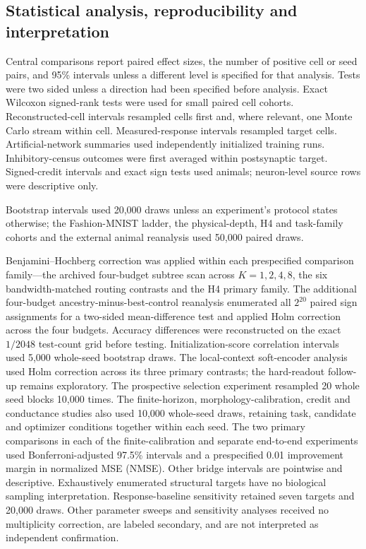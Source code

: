 \subsection{Statistical analysis, reproducibility and interpretation}
\label{note:statistics}

Central comparisons report paired effect sizes, the number of positive cell
or seed pairs, and 95\% intervals unless a different level is specified for
that analysis. Tests were two sided unless a direction had been specified
before analysis. Exact Wilcoxon signed-rank tests were used for
small paired cell cohorts. Reconstructed-cell intervals resampled cells first
and, where relevant, one Monte Carlo stream within cell. Measured-response
intervals resampled target cells. Artificial-network summaries used
independently initialized training runs. Inhibitory-census outcomes were first
averaged within postsynaptic target. Signed-credit intervals and exact sign
tests used animals; neuron-level source rows were descriptive only.

Bootstrap intervals used 20,000 draws unless an experiment's protocol states
otherwise; the Fashion-MNIST ladder, the physical-depth, H4 and task-family
cohorts and the external animal reanalysis used 50,000 paired draws.

Benjamini--Hochberg correction was applied within each prespecified comparison
family---the archived four-budget subtree scan across $K=1,2,4,8$, the six
bandwidth-matched routing contrasts and the H4 primary family. The additional four-budget ancestry-minus-best-control reanalysis enumerated
all $2^{20}$ paired sign assignments for a two-sided mean-difference test
and applied Holm correction across the four budgets. Accuracy differences
were reconstructed on the exact $1/2048$ test-count grid before testing.
Initialization-score correlation intervals used 5,000 whole-seed bootstrap
draws. The local-context soft-encoder analysis used Holm correction across its
three primary contrasts; the hard-readout follow-up remains exploratory. The prospective selection experiment resampled 20 whole seed blocks 10,000
times. The finite-horizon, morphology-calibration, credit and conductance studies
also used 10,000 whole-seed draws, retaining task, candidate and optimizer
conditions together within each seed. The two primary comparisons in each of the finite-calibration and
separate end-to-end experiments used Bonferroni-adjusted 97.5\% intervals and
a prespecified 0.01 improvement margin in normalized MSE (NMSE). Other bridge
intervals are pointwise and descriptive. Exhaustively enumerated structural targets have
no biological sampling interpretation. Response-baseline sensitivity retained seven
targets and 20,000 draws. Other parameter
sweeps and sensitivity analyses received no multiplicity correction, are
labeled secondary, and are not interpreted as independent confirmation.

